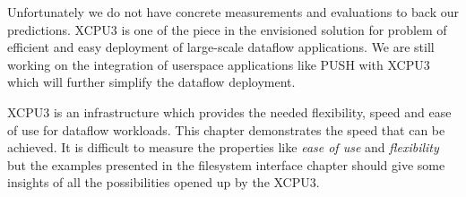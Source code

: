 Unfortunately we do not have concrete measurements and evaluations to back our
predictions.  XCPU3 is one of the piece in the envisioned solution for problem
of efficient and easy deployment of large-scale dataflow applications.   We are
still working on the integration of userspace applications like
PUSH\cite{PODC:Push} with XCPU3 which will further simplify the dataflow
deployment.

XCPU3 is an infrastructure which provides the needed flexibility, speed and 
ease of use for dataflow workloads.  This chapter demonstrates the speed that
can be achieved.  It is difficult to measure the properties like \textit{ease of
use} and \textit{flexibility} but the examples presented in the filesystem
interface chapter should give some insights of all the possibilities opened up
by the XCPU3.

